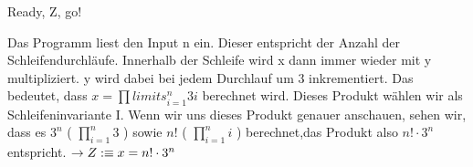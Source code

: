 \documentclass[
  english
]{tumteaching}
\begin{document}
\begin{assignment}[H, points=6]{Ready, Z, go!}
\begin{center}
  \end{center}

Das Programm liest den Input n ein. Dieser entspricht der Anzahl der Schleifendurchläufe. Innerhalb der Schleife wird x dann immer wieder mit y multipliziert. y wird dabei bei jedem Durchlauf um 3 inkrementiert. Das bedeutet, dass \(x = \prod limits_{i=1}^{n} 3i\) berechnet wird. Dieses Produkt wählen wir als Schleifeninvariante I. Wenn wir uns dieses Produkt genauer anschauen, sehen wir, dass es \(3^n\) ( \(\prod \limits_{i=1}^{n} 3\) ) sowie \(n!\) ( \(\prod \limits_{i=1}^{n} i\) ) berechnet,das Produkt also \(n! \cdot 3^n\) entspricht.
\(\rightarrow Z :\equiv x = n! \cdot 3^n\)


\end{assignment}
\end{document}

